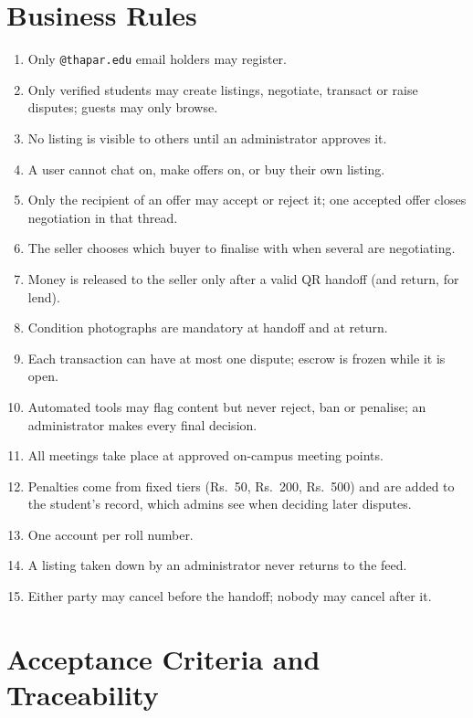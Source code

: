 \documentclass[11pt,a4paper]{scrreprt}
\begin{document}
\chapter{Business Rules}
\begin{enumerate}[label=\textbf{BR-\arabic*.}]
  \item Only \texttt{@thapar.edu} email holders may register.
  \item Only verified students may create listings, negotiate, transact or
    raise disputes; guests may only browse.
  \item No listing is visible to others until an administrator approves it.
  \item A user cannot chat on, make offers on, or buy their own listing.
  \item Only the recipient of an offer may accept or reject it; one accepted
    offer closes negotiation in that thread.
  \item The seller chooses which buyer to finalise with when several are
    negotiating.
  \item Money is released to the seller only after a valid QR handoff (and
    return, for lend).
  \item Condition photographs are mandatory at handoff and at return.
  \item Each transaction can have at most one dispute; escrow is frozen
    while it is open.
  \item Automated tools may flag content but never reject, ban or penalise;
    an administrator makes every final decision.
  \item All meetings take place at approved on-campus meeting points.
  \item Penalties come from fixed tiers (Rs.~50, Rs.~200, Rs.~500) and
    are added to the student's record, which admins see when deciding later
    disputes.
  \item One account per roll number.
  \item A listing taken down by an administrator never returns to the feed.
  \item Either party may cancel before the handoff; nobody may cancel after it.
\end{enumerate}

\chapter{Acceptance Criteria and Traceability}
\end{document}
